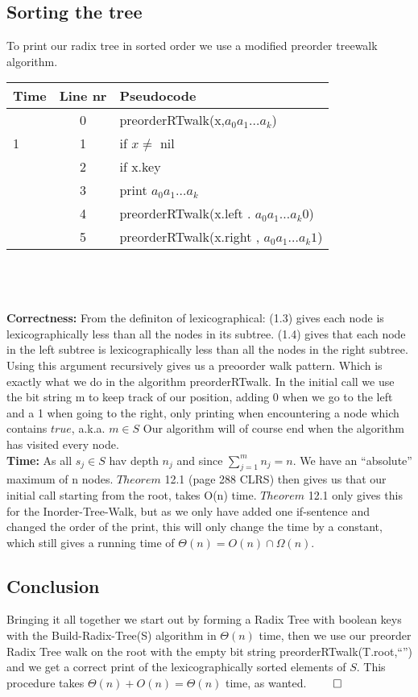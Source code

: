 \documentclass{article}
\theoremstyle{remark}
\numberwithin{equation}{section}
\begin{document}
\subsection{Sorting the tree}
To print our radix tree in sorted order we use a modified preorder treewalk algorithm.\\
\begin{tabular}{l | c | l}
	Time & Line nr & Pseudocode \\ \hline
	& 0 &preorderRTwalk(x,$a_0a_1\dots a_k$)\\
	1 & 1 & if $x\neq $ nil\\
	\indent1 & 2 & \indent if x.key\\
	\indent\indent1 & 3 & \indent\indent print $a_0a_1\dots a_k$\\
	\indent 1 & 4 & \indent preorderRTwalk(x.left . $a_0a_1\dots a_k0$)\\
	\indent 1 & 5 & \indent preorderRTwalk(x.right , $a_0a_1\dots a_k1$)
\end{tabular}\\\\\\
\textbf{Correctness:} From the definiton of lexicographical: (1.3) gives each node is lexicographically less than all the nodes in its subtree. (1.4) gives that each node in the left subtree is lexicographically less than all the nodes in the right subtree.
\\Using this argument recursively gives us a preoorder walk pattern. Which is exactly what we do in the algorithm preorderRTwalk. In the initial call we use the bit string m to keep track of our position, adding 0 when we go to the left and a 1 when going to the right, only printing when encountering a node which contains $true$, a.k.a. $m \in S$ Our algorithm will of course end when the algorithm has visited every node.
\\
\noindent \textbf{Time:} As all $s_{j} \in S$ hav depth $n_{j}$ and since $\sum_{j=1}^{m}n_{j}=n$. We have an ``absolute''  maximum of n nodes. $Theorem$  12.1 (page 288 CLRS) then gives us that our initial call starting from the root, takes O(n) time. $Theorem$ 12.1 only gives this for the Inorder-Tree-Walk, but as we only have added one if-sentence and changed the order of the print, this will only change the time by a constant, which still gives a running time of $\Theta(n) = O(n)\cap \Omega(n)$.
\subsection{Conclusion}
Bringing it all together we start out by forming a Radix Tree with boolean keys with the Build-Radix-Tree(S) algorithm in $\Theta(n)$ time, then we use our preorder Radix Tree walk on the root with the empty bit string preorderRTwalk(T.root,``'') and we get a correct print of the lexicographically sorted elements of $S$. This procedure takes $\Theta(n)+O(n) = \Theta(n)$ time, as wanted. $\qed$
\end{document}
